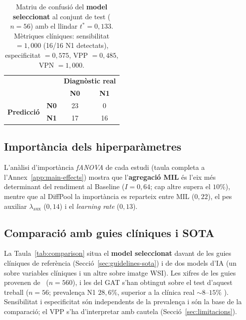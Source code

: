 \documentclass[10pt,a4paper,twocolumn,twoside]{article}
\begin{document}
\begin{table}[h]
\centering
\caption{Matriu de confusió del \textbf{model seleccionat} al conjunt de
test ($n=56$) amb el llindar $t^*=0{,}133$.
Mètriques clíniques: sensibilitat $=1{,}000$ (16/16 N1 detectats),
especificitat $=0{,}575$, VPP $=0{,}485$, VPN $=1{,}000$.}
\label{tab:cm}
\small
\begin{tabular}{llcc}
\toprule
 & & \multicolumn{2}{c}{\textbf{Diagnòstic real}} \\
 & & \textbf{N0} & \textbf{N1} \\
\midrule
\multirow{2}{*}{\textbf{Predicció}}
  & \textbf{N0} & 23 & 0 \\
  & \textbf{N1} & 17 & 16 \\
\bottomrule
\end{tabular}
\end{table}

\subsection{Importància dels hiperparàmetres}
\label{sec:main-effects}

L'anàlisi d'importància \textit{fANOVA} de cada estudi (taula completa a
l'Annex~\ref{app:main-effects}) mostra que l'\textbf{agregació MIL} és l'eix més
determinant del rendiment al Baseline ($I=0{,}64$; cap altre supera el $10\%$),
mentre que al DiffPool la importància es reparteix entre MIL ($0{,}22$), el pes
auxiliar $\lambda_{\text{aux}}$ ($0{,}14$) i el \textit{learning rate} ($0{,}13$).

\subsection{Comparació amb guies clíniques i SOTA}
\label{sec:resultats-comparacio}

La Taula~\ref{tab:comparison} situa el \textbf{model seleccionat} davant de les guies
clíniques de referència (Secció~\ref{sec:guidelines-sota}) i de dos models d'IA (un sobre
variables clíniques i un altre sobre imatge WSI).
Les xifres de les guies provenen de~\cite{tanino2024comparative} ($n\!=\!560$),
i les del GAT s'han obtingut sobre el test d'aquest treball ($n\!=\!56$;
prevalença N1 $28{,}6\%$, superior a la clínica real $\sim\!8$–$15\%$
\cite{zaffalon2023}). Sensibilitat i especificitat són independents de la
prevalença i són la base de la comparació; el VPP s'ha d'interpretar amb
cautela (Secció~\ref{sec:limitacions}).
\end{document}
